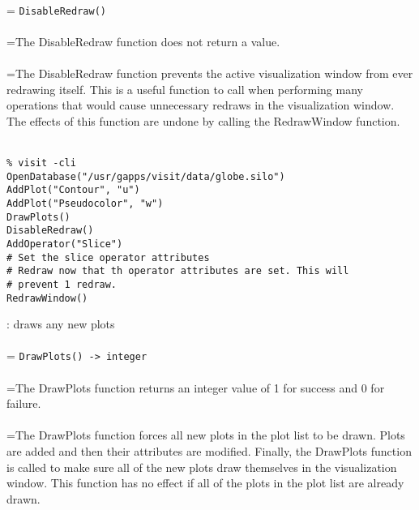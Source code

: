 \documentclass[10pt,a4paper]{report}
\begin{document}
 \\ 
\hangindent=\parindent 
\verb!DisableRedraw()!\\ [-3mm]

 \\ 
\hangindent=\parindent The DisableRedraw function does not return a value. \\[-3mm] 

 \\ 
\hangindent=\parindent The DisableRedraw function prevents the active visualization window from ever redrawing itself. This is a useful function to call when performing many operations that would cause unnecessary redraws in the visualization window. The effects of this function are undone by calling the RedrawWindow function. \\[-3mm] 

\\[-6mm]
\begin{verbatim}% visit -cli
OpenDatabase("/usr/gapps/visit/data/globe.silo")
AddPlot("Contour", "u")
AddPlot("Pseudocolor", "w")
DrawPlots()
DisableRedraw()
AddOperator("Slice")
# Set the slice operator attributes
# Redraw now that th operator attributes are set. This will 
# prevent 1 redraw.
RedrawWindow()
\end{verbatim}
\newpage


{}
: draws any new plots\\[-3mm]

 \\ 
\hangindent=\parindent 
\verb!DrawPlots() -> integer!\\ [-3mm]

 \\ 
\hangindent=\parindent The DrawPlots function returns an integer value of 1 for success and 0 for failure. \\[-3mm] 

 \\ 
\hangindent=\parindent The DrawPlots function forces all new plots in the plot list to be drawn. Plots are added and then their attributes are modified. Finally, the DrawPlots function is called to make sure all of the new plots draw themselves in the visualization window. This function has no effect if all of the plots in the plot list are already drawn. \\[-3mm] 
\end{document}
